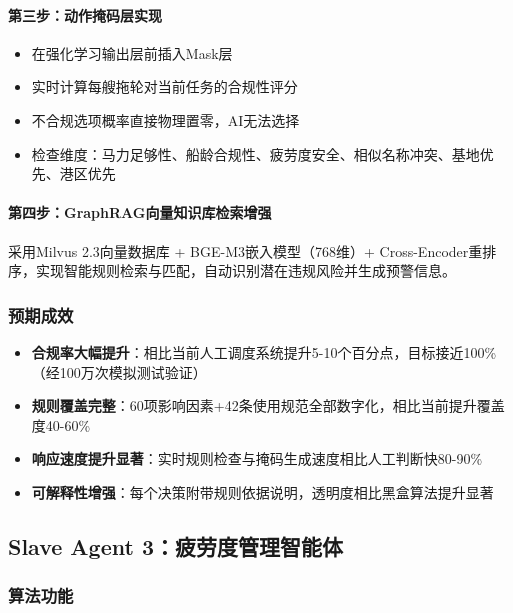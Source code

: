 \documentclass[12pt,a4paper]{article}
\begin{document}
\paragraph{第三步：动作掩码层实现}

\begin{itemize}[leftmargin=*]
    \item 在强化学习输出层前插入Mask层
    \item 实时计算每艘拖轮对当前任务的合规性评分
    \item 不合规选项概率直接物理置零，AI无法选择
    \item 检查维度：马力足够性、船龄合规性、疲劳度安全、相似名称冲突、基地优先、港区优先
\end{itemize}

\paragraph{第四步：GraphRAG向量知识库检索增强}

采用Milvus 2.3向量数据库 + BGE-M3嵌入模型（768维）+ Cross-Encoder重排序，实现智能规则检索与匹配，自动识别潜在违规风险并生成预警信息。

\subsubsection{预期成效}

\begin{itemize}[leftmargin=*]
    \item[\checkmark] \textbf{合规率大幅提升}：相比当前人工调度系统提升5-10个百分点，目标接近100\%（经100万次模拟测试验证）
    \item[\checkmark] \textbf{规则覆盖完整}：60项影响因素+42条使用规范全部数字化，相比当前提升覆盖度40-60\%
    \item[\checkmark] \textbf{响应速度提升显著}：实时规则检查与掩码生成速度相比人工判断快80-90\%
    \item[\checkmark] \textbf{可解释性增强}：每个决策附带规则依据说明，透明度相比黑盒算法提升显著
\end{itemize}

\subsection{Slave Agent 3：疲劳度管理智能体}

\subsubsection{算法功能}
\end{document}
